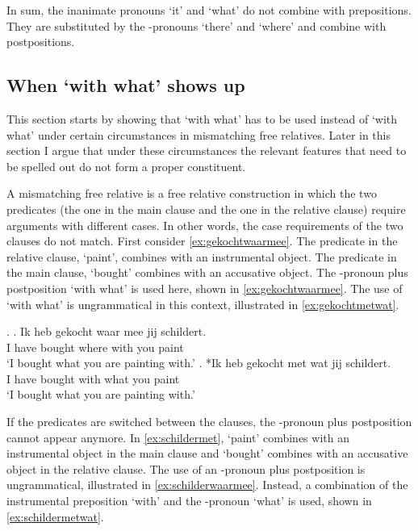 \documentclass[11pt,a4paper]{article}
\begin{document}
In sum, the inanimate pronouns  `it' and  `what' do not combine with prepositions. They are substituted by the -pronouns  `there' and  `where' and combine with postpositions.


\subsection{When  `with what' shows up}

This section starts by showing that  `with what' has to be used instead of  `with what' under certain circumstances in mismatching free relatives. Later in this section I argue that under these circumstances the relevant features that need to be spelled out do not form a proper constituent.

A mismatching free relative is a free relative construction in which the two predicates (the one in the main clause and the one in the relative clause) require arguments with different cases. In other words, the case requirements of the two clauses do not match. First consider \ref{ex:gekochtwaarmee}. The predicate in the relative clause,  `paint', combines with an instrumental object. The predicate in the main clause,  `bought' combines with an accusative object. The -pronoun plus postposition  `with what' is used here, shown in \ref{ex:gekochtwaarmee}. The use of  `with what' is ungrammatical in this context, illustrated in \ref{ex:gekochtmetwat}.

\ex.
\ag. Ik heb gekocht waar mee jij schildert.\\
 I have bought where with you paint\\
 `I bought what you are painting with.'\label{ex:gekochtwaarmee}
\bg. *Ik heb gekocht met wat jij schildert.\\
 I have bought with what you paint\\
 `I bought what you are painting with.'\label{ex:gekochtmetwat}

If the predicates are switched between the clauses, the -pronoun plus postposition cannot appear anymore. In \ref{ex:schildermet},  `paint' combines with an instrumental object in the main clause and  `bought' combines with an accusative object in the relative clause.
The use of an -pronoun plus postposition is ungrammatical, illustrated in \ref{ex:schilderwaarmee}. Instead, a combination of the instrumental preposition  `with' and the -pronoun  `what' is used, shown in \ref{ex:schildermetwat}.
\end{document}
